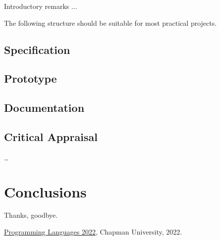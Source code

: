 \documentclass{article}
\theoremstyle{theorem}
\theoremstyle{definition}
\theoremstyle{remark}
\begin{document}
Introductory remarks ...

The following structure should be suitable for most practical projects. 

\subsection{Specification}
\subsection{Prototype}
\subsection{Documentation}
\subsection{Critical Appraisal}

\ldots

\section{Conclusions}\label{conclusions}


Thanks, goodbye.

\begin{thebibliography}{99}
 \href{https://github.com/alexhkurz/programming-languages-2022/blob/main/README.md}{Programming Languages 2022}, Chapman University, 2022.
\end{thebibliography}
\end{document}
